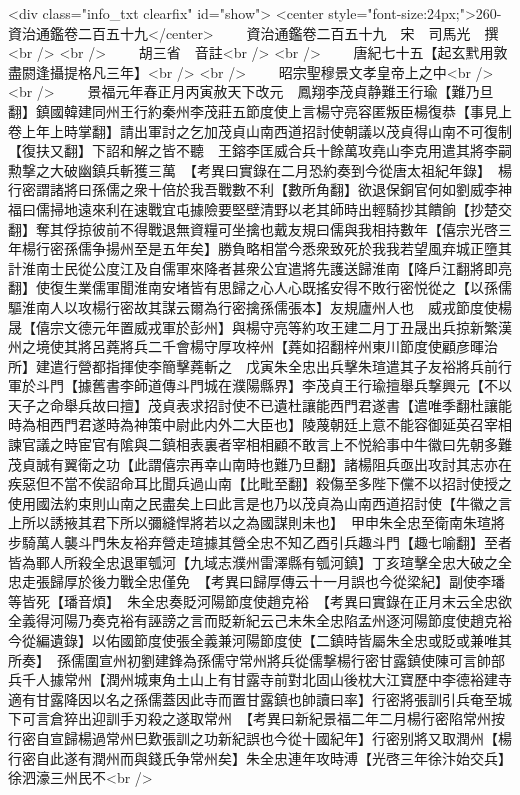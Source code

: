 <div class="info_txt clearfix" id="show">
<center style="font-size:24px;">260-資治通鑑卷二百五十九</center>
  　　資治通鑑卷二百五十九　宋　司馬光　撰<br />
<br />
　　胡三省　音註<br />
<br />
　　唐紀七十五【起玄黓用敦盡閼逢攝提格凡三年】<br />
<br />
　　昭宗聖穆景文孝皇帝上之中<br />
<br />
　　景福元年春正月丙寅赦天下改元　鳳翔李茂貞静難王行瑜【難乃旦翻】鎮國韓建同州王行約秦州李茂莊五節度使上言楊守亮容匿叛臣楊復恭【事見上卷上年上時掌翻】請出軍討之乞加茂貞山南西道招討使朝議以茂貞得山南不可復制【復扶又翻】下詔和解之皆不聽　王鎔李匡威合兵十餘萬攻堯山李克用遣其將李嗣勲撃之大破幽鎮兵斬獲三萬　【考異曰實錄在二月恐約奏到今從唐太祖紀年錄】　楊行密謂諸將曰孫儒之衆十倍於我吾戰數不利【數所角翻】欲退保銅官何如劉威李神福曰儒掃地遠來利在速戰宜屯據險要堅壁清野以老其師時出輕騎抄其饋餉【抄楚交翻】奪其俘掠彼前不得戰退無資糧可坐擒也戴友規曰儒與我相持數年【僖宗光啓三年楊行密孫儒争揚州至是五年矣】勝負略相當今悉衆致死於我我若望風弃城正墮其計淮南士民從公度江及自儒軍來降者甚衆公宜遣將先護送歸淮南【降戶江翻將即亮翻】使復生業儒軍聞淮南安堵皆有思歸之心人心既搖安得不敗行密悦從之【以孫儒驅淮南人以攻楊行密故其謀云爾為行密擒孫儒張本】友規廬州人也　威戎節度使楊晟【僖宗文德元年置威戎軍於彭州】與楊守亮等約攻王建二月丁丑晟出兵掠新繁漢州之境使其將呂蕘將兵二千會楊守厚攻梓州【蕘如招翻梓州東川節度使顧彦暉治所】建遣行營都指揮使李簡擊蕘斬之　戊寅朱全忠出兵擊朱瑄遣其子友裕將兵前行軍於斗門【據舊書李師道傳斗門城在濮陽縣界】李茂貞王行瑜擅舉兵撃興元【不以天子之命舉兵故曰擅】茂貞表求招討使不已遺杜讓能西門君遂書【遣唯季翻杜讓能時為相西門君遂時為神策中尉此内外二大臣也】陵蔑朝廷上意不能容御延英召宰相諫官議之時宦官有隂與二鎮相表裏者宰相相顧不敢言上不悦給事中牛徽曰先朝多難茂貞誠有翼衛之功【此謂僖宗再幸山南時也難乃旦翻】諸楊阻兵亟出攻討其志亦在疾惡但不當不俟詔命耳比聞兵過山南【比毗至翻】殺傷至多陛下儻不以招討使授之使用國法約束則山南之民盡矣上曰此言是也乃以茂貞為山南西道招討使【牛徽之言上所以誘掖其君下所以彌縫悍將若以之為國謀則未也】　甲申朱全忠至衛南朱瑄將步騎萬人襲斗門朱友裕弃營走瑄據其營全忠不知乙酉引兵趣斗門【趣七喻翻】至者皆為鄆人所殺全忠退軍瓠河【九域志濮州雷澤縣有瓠河鎮】丁亥瑄擊全忠大破之全忠走張歸厚於後力戰全忠僅免　【考異曰歸厚傳云十一月誤也今從梁紀】副使李璠等皆死【璠音煩】　朱全忠奏貶河陽節度使趙克裕　【考異曰實錄在正月末云全忠欲全義得河陽乃奏克裕有誣謗之言而貶新紀云己未朱全忠陷孟州逐河陽節度使趙克裕今從編遺錄】以佑國節度使張全義兼河陽節度使【二鎮時皆屬朱全忠或貶或兼唯其所奏】　孫儒圍宣州初劉建鋒為孫儒守常州將兵從儒撃楊行密甘露鎮使陳可言帥部兵千人據常州【潤州城東角土山上有甘露寺前對北固山後枕大江寶歷中李德裕建寺適有甘露降因以名之孫儒蓋因此寺而置甘露鎮也帥讀曰率】行密將張訓引兵奄至城下可言倉猝出迎訓手刃殺之遂取常州　【考異曰新紀景福二年二月楊行密陷常州按行密自宣歸楊過常州巳歎張訓之功新紀誤也今從十國紀年】行密别將又取潤州【楊行密自此遂有潤州而與錢氏争常州矣】朱全忠連年攻時溥【光啓三年徐汴始交兵】徐泗濠三州民不<br />
